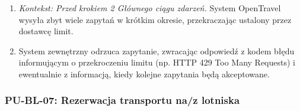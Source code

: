 \documentclass[a4paper,12pt]{article}
\begin{document}
\begin{itemize}
\begin{itemize}
                \begin{enumerate}
                    \item \textit{Kontekst: Przed krokiem 2 Głównego ciągu zdarzeń.} System OpenTravel wysyła zbyt wiele zapytań w krótkim okresie, przekraczając ustalony przez dostawcę limit.
                    \item System zewnętrzny odrzuca zapytanie, zwracając odpowiedź z kodem błędu informującym o przekroczeniu limitu (np. HTTP 429 Too Many Requests) i ewentualnie z informacją, kiedy kolejne zapytania będą akceptowane.
                \end{enumerate}
        \end{itemize}
\end{itemize}

\subsubsection{PU-BL-07: Rezerwacja transportu na/z lotniska}
\end{document}
